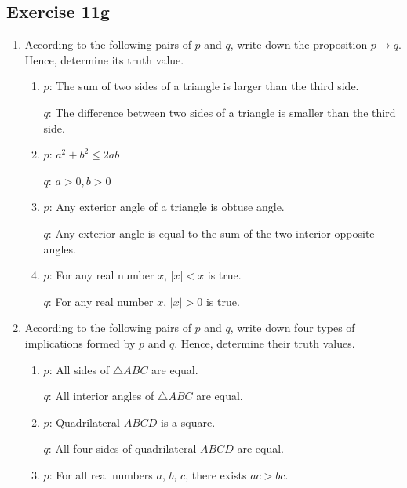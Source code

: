 \documentclass{report}
\begin{document}
\subsection*{Exercise 11g}
\begin{enumerate}[leftmargin=*]
    \item According to the following pairs of $p$ and $q$, write down the proposition $p
              \rightarrow q$. Hence, determine its truth value.
          \begin{enumerate}[label=(\alph*), leftmargin=*]
              \item $p$: The sum of two sides of a triangle is larger than the third side.

                    $q$: The difference between two sides of a triangle is smaller than the third side.

              \item $p$: $a^2 + b^2 \leq 2ab$

                    $q$: $a > 0, b > 0$

              \item $p$: Any exterior angle of a triangle is obtuse angle.

                    $q$: Any exterior angle is equal to the sum of the two interior opposite angles.

              \item $p$: For any real number $x$, $|x| < x$ is true.

                    $q$: For any real number $x$, $|x| > 0$ is true.
          \end{enumerate}

    \item According to the following pairs of $p$ and $q$, write down four types of
          implications formed by $p$ and $q$. Hence, determine their truth values.
          \begin{enumerate}[label=(\alph*), leftmargin=*]
              \item $p$: All sides of $\triangle ABC$ are equal.

                    $q$: All interior angles of $\triangle ABC$ are equal.

              \item $p$: Quadrilateral $ABCD$ is a square.

                    $q$: All four sides of quadrilateral $ABCD$ are equal.

              \item $p$: For all real numbers $a$, $b$, $c$, there exists $ac > bc$.


\end{enumerate}
\end{enumerate}
\end{document}
